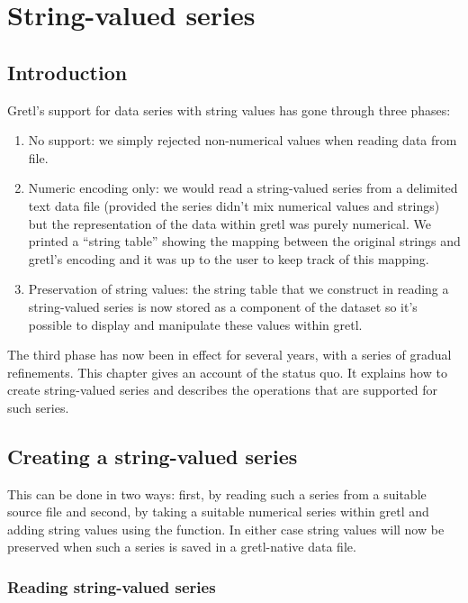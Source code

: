 \chapter{String-valued series}
\label{chap:strval-series}

\section{Introduction}

Gretl's support for data series with string values has gone through
three phases:
\begin{enumerate}
\item No support: we simply rejected non-numerical values when reading
  data from file.
\item Numeric encoding only: we would read a string-valued series from
  a delimited text data file (provided the series didn't mix numerical
  values and strings) but the representation of the data within gretl
  was purely numerical. We printed a ``string table'' showing the
  mapping between the original strings and gretl's encoding and it was
  up to the user to keep track of this mapping.
\item Preservation of string values: the string table that we
  construct in reading a string-valued series is now stored as a
  component of the dataset so it's possible to display and manipulate
  these values within gretl.
\end{enumerate}

The third phase has now been in effect for several years, with a
series of gradual refinements. This chapter gives an account of the
status quo. It explains how to create string-valued series and
describes the operations that are supported for such series.

\section{Creating a string-valued series}

This can be done in two ways: first, by reading such a series from a
suitable source file and second, by taking a suitable numerical series
within gretl and adding string values using the 
function. In either case string values will now be preserved when such
a series is saved in a gretl-native data file.

\subsection{Reading string-valued series}
\label{sec:reading}


